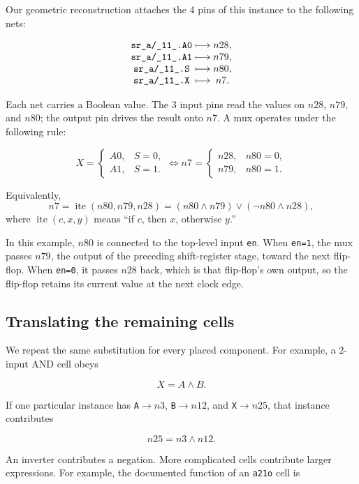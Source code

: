\documentclass[11pt]{article}
\begin{document}
Our geometric reconstruction attaches the 4 pins of this instance to the following nets:

\[
  \begin{array}{c@{\;\longmapsto\;}c}
    \texttt{sr\_a/\_11\_.A0} & n28,\\
    \texttt{sr\_a/\_11\_.A1} & n79,\\
    \texttt{sr\_a/\_11\_.S}  & n80,\\
    \texttt{sr\_a/\_11\_.X}  & n7.
  \end{array}
\]

Each net carries a Boolean value. The 3 input pins read the values on $n28$, $n79$, and $n80$; the output pin drives the result onto $n7$. A mux operates under the following rule:

\[
  X =
  \begin{cases}
    A0,&S=0,\\
    A1,&S=1.
  \end{cases}
  \iff
  n7 =
  \begin{cases}
    n28,&n80=0,\\
    n79,&n80=1.
  \end{cases}
\]

Equivalently,
\[
  n7
  = \operatorname{ite}(n80,n79,n28)
  = (n80\land n79)\lor(\neg n80\land n28),
\]
where $\operatorname{ite}(c,x,y)$ means ``if $c$, then $x$, otherwise $y$.''

In this example, $n80$ is connected to the top-level input \texttt{en}. When \texttt{en=1}, the mux passes $n79$, the output of the preceding shift-register stage, toward the next flip-flop. When \texttt{en=0}, it passes $n28$ back, which is that flip-flop's own output, so the flip-flop retains its current value at the next clock edge.

\subsection{Translating the remaining cells}

We repeat the same substitution for every placed component. For example, a 2-input AND cell obeys

\[
  X=A\land B.
\]

If one particular instance has \texttt{A}$\to n3$,
\texttt{B}$\to n12$, and \texttt{X}$\to n25$, that instance contributes

\[
  n25=n3\land n12.
\]

An inverter contributes a negation. More complicated cells contribute larger
expressions. For example, the documented function of an \texttt{a21o} cell is
\end{document}
